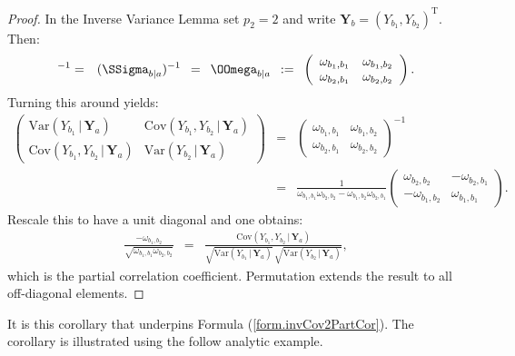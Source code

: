 \documentclass[a4paper]{article}
\theoremstyle{myexamplestyle}
\begin{document}
\begin{proof}
In the Inverse Variance Lemma set $p_2 = 2$ and write $\mathbf{Y}_b = (Y_{b_1}, Y_{b_2})^{\mathrm{T}}$. Then:
\begin{eqnarray*}
[\mbox{Var}(\mathbf{Y}_b \, | \, \mathbf{Y}_a)]^{-1} & = & (\SSigma_{b| a})^{-1} \, \, \, = \, \,\, \OOmega_{b|a}
\, \, \, := \, \, \,
\left( 
\begin{array}{rr}
\omega_{b_1, b_1} & \omega_{b_1, b_2}
\\
\omega_{b_2, b_1} & \omega_{b_2, b_2}
\end{array}
\right).
\end{eqnarray*}
Turning this around yields:
\begin{eqnarray*}
\left(
\begin{array}{rr}
\mbox{Var}(Y_{b_1} \, | \, \mathbf{Y}_a) & \mbox{Cov}(Y_{b_1}, Y_{b_2} \, | \, \mathbf{Y}_a)
\\
\mbox{Cov}(Y_{b_1}, Y_{b_2} \, | \, \mathbf{Y}_a) & \mbox{Var}(Y_{b_2} \, | \, \mathbf{Y}_a)
\end{array}
\right)
& = & 
\left( 
\begin{array}{rr}
\omega_{b_1, b_1} & \omega_{b_1, b_2}
\\
\omega_{b_2, b_1} & \omega_{b_2, b_2}
\end{array}
\right)^{-1}
\\
& = & 
\frac{1}{\omega_{b_1, b_1} \omega_{b_2, b_2} - \omega_{b_1, b_2} \omega_{b_2, b_1}} \left( 
\begin{array}{rr}
\omega_{b_2, b_2} & -\omega_{b_2, b_1}
\\
-\omega_{b_1, b_2} & \omega_{b_1, b_1}
\end{array}
\right).
\end{eqnarray*}
Rescale this to have a unit diagonal and one obtains:
\begin{eqnarray*}
\frac{-\omega_{b_1, b_2}}{\sqrt{\omega_{b_1, b_1} \omega_{b_2, b_2}}} & = & \frac{\mbox{Cov}(Y_{b_1}, Y_{b_2} \, | \, \mathbf{Y}_a)}
{\sqrt{ \mbox{Var}(Y_{b_1} \, | \, \mathbf{Y}_a)} \, \sqrt{\mbox{Var}(Y_{b_2} \, | \, \mathbf{Y}_a)}},
\end{eqnarray*}
which is the partial correlation coefficient. Permutation extends the result to all off-diagonal elements.
\end{proof}

It is this corollary that underpins Formula (\ref{form.invCov2PartCor}). The corollary is illustrated using the follow analytic example. 
\end{document}
